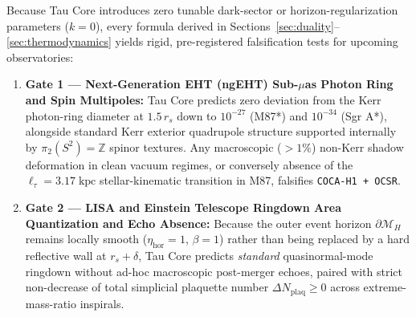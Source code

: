 \documentclass[11pt,a4paper]{article}
\theoremstyle{remark}
\begin{document}
Because Tau Core introduces zero tunable dark-sector or horizon-regularization parameters ($k = 0$), every formula derived in Sections~\ref{sec:duality}--\ref{sec:thermodynamics} yields rigid, pre-registered falsification tests for upcoming observatories:
\begin{enumerate}
  \item \textbf{Gate 1 --- Next-Generation EHT (ngEHT) Sub-$\mu$as Photon Ring and Spin Multipoles:} Tau Core predicts zero deviation from the Kerr photon-ring diameter at $1.5\,r_s$ down to $10^{-27}$ (M87*) and $10^{-34}$ (Sgr A*), alongside standard Kerr exterior quadrupole structure supported internally by $\pi_2(S^2) = \mathbb{Z}$ spinor textures. Any macroscopic ($> 1\%$) non-Kerr shadow deformation in clean vacuum regimes, or conversely absence of the $\ell_\tau = 3.17\;\mathrm{kpc}$ stellar-kinematic transition in M87, falsifies \texttt{COCA-H1 + OCSR}.
  \item \textbf{Gate 2 --- LISA and Einstein Telescope Ringdown Area Quantization and Echo Absence:} Because the outer event horizon $\partial\mathcal{M}_H$ remains locally smooth ($\eta_{\mathrm{hor}} = 1$, $\beta = 1$) rather than being replaced by a hard reflective wall at $r_s + \delta$, Tau Core predicts \emph{standard} quasinormal-mode ringdown without ad-hoc macroscopic post-merger echoes, paired with strict non-decrease of total simplicial plaquette number $\Delta N_{\mathrm{plaq}} \ge 0$ across extreme-mass-ratio inspirals.

\end{enumerate}
\end{document}
